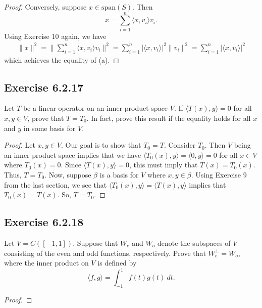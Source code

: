 \begin{enumerate}
\begin{proof}
        Conversely, suppose \( x \in \text{span}(S) \). Then
        \[  x = \sum_{ i=1  }^{ n  } \langle x , {v}_{i} \rangle {v}_{i}.  \]
        Using Exercise 10 again, we have
        \begin{align*}
            \|x\|^{2} = \Big\| \sum_{ i=1  }^{ n  } \langle x , {v}_{i} \rangle {v}_{i} \Big\|^{2} = \sum_{ i=1  }^{ n } | \langle x , {v}_{i} \rangle |^{2} \|{v}_{i}\|^{2} = \sum_{ i=1  }^{ n  } | \langle x , {v}_{i} \rangle |^{2} 
        \end{align*}
        which achieves the equality of (a).
        \end{proof}
\end{enumerate}

\subsection*{Exercise 6.2.17} Let \( T  \) be a linear operator on an inner product space \( V  \). If \( \langle T(x) , y \rangle = 0  \) for all \( x,y \in V  \), prove that \( T = {T}_{0} \). In fact, prove this result if the equality holds for all \( x  \) and \( y  \) in some basis for \( V  \).
\begin{proof}
Let \( x,y \in V  \). Our goal is to show that \( {T}_{0} = T \). Consider \( {T}_{0}  \). Then \( V  \) being an inner product space implies that we have \( \langle {T}_{0}(x) , y \rangle = \langle 0 , y \rangle = 0  \) for all \( x \in V  \) where \( {T}_{0}(x) = 0  \). Since \( \langle T(x) , y \rangle = 0  \), this must imply that \( T(x) = {T}_{0}(x)   \). Thus, \( T = {T}_{0} \). Now, suppose \( \beta  \) is a basis for \( V  \) where \( x,y \in \beta \). Using Exercise 9 from the last section, we see that \( \langle {T}_{0}(x) , y \rangle = \langle T(x) , y \rangle  \) implies that \( {T}_{0}(x) = T(x) \). So, \( T = {T}_{0} \).
\end{proof}

\subsection*{Exercise 6.2.18} Let \( V = C([-1,1]) \). Suppose that \( {W}_{e} \) and \( {W}_{o} \) denote the subspaces of \( V  \) consisting of the even and odd functions, respectively. Prove that \( W^{\perp}_{e} = W_{o} \), where the inner product on \( V  \) is defined by 
\[  \langle f , g \rangle = \int_{ -1 }^{ 1 }  f(t) g(t) \ dt. \]
\begin{proof}

\end{proof}

